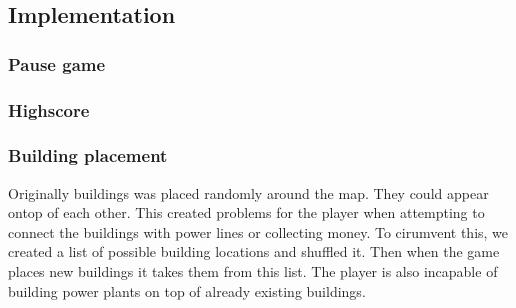 \subsection{Implementation}

	\subsubsection*{Pause game}

	\subsubsection*{Highscore}

	\subsubsection*{Building placement}
	Originally buildings was placed randomly around the map. They could appear
	ontop of each other. This created problems for the player when attempting to
	connect the buildings with power lines or collecting money. To cirumvent
	this, we created a list of possible building locations and shuffled it. Then
	when the game places new buildings it takes them from this list. The player
	is also incapable of building power plants on top of already existing
	buildings.
	
